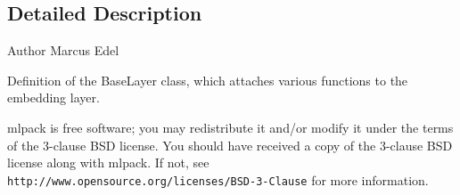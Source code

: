 \subsection{Detailed Description}
\begin{DoxyAuthor}{Author}
Marcus Edel
\end{DoxyAuthor}
Definition of the Base\+Layer class, which attaches various functions to the embedding layer.

mlpack is free software; you may redistribute it and/or modify it under the terms of the 3-\/clause B\+SD license. You should have received a copy of the 3-\/clause B\+SD license along with mlpack. If not, see {\tt http\+://www.\+opensource.\+org/licenses/\+B\+S\+D-\/3-\/\+Clause} for more information. 